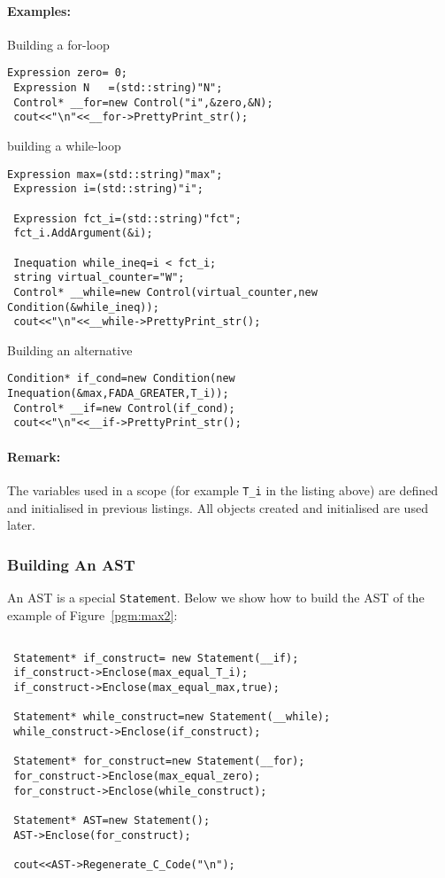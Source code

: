 \paragraph{Examples:}
Building a for-loop
\begin{lstlisting}[frame=single,framerule=0pt]
 Expression zero= 0;
 Expression N   =(std::string)"N";
 Control* __for=new Control("i",&zero,&N);
 cout<<"\n"<<__for->PrettyPrint_str();

\end{lstlisting}
building a while-loop
\begin{lstlisting}[frame=single,framerule=0pt]
 Expression max=(std::string)"max";
 Expression i=(std::string)"i";

 Expression fct_i=(std::string)"fct";
 fct_i.AddArgument(&i);

 Inequation while_ineq=i < fct_i;
 string virtual_counter="W";
 Control* __while=new Control(virtual_counter,new Condition(&while_ineq));
 cout<<"\n"<<__while->PrettyPrint_str();
\end{lstlisting}
Building an alternative
\begin{lstlisting}[frame=single,framerule=0pt]
 Condition* if_cond=new Condition(new Inequation(&max,FADA_GREATER,T_i));
 Control* __if=new Control(if_cond);
 cout<<"\n"<<__if->PrettyPrint_str();
\end{lstlisting}
\paragraph{Remark:} The variables used in a scope (for example \verb|T_i| in the listing above) are defined and initialised in previous listings. All objects created and initialised are used later.


\subsubsection{Building An AST}
An AST is a special \verb|Statement|. Below we show how to build the AST of the example of Figure~\ref{pgm:max2}:
\begin{lstlisting}[frame=single,framerule=0pt]

 Statement* if_construct= new Statement(__if);
 if_construct->Enclose(max_equal_T_i);
 if_construct->Enclose(max_equal_max,true);

 Statement* while_construct=new Statement(__while);
 while_construct->Enclose(if_construct);

 Statement* for_construct=new Statement(__for);
 for_construct->Enclose(max_equal_zero);
 for_construct->Enclose(while_construct);

 Statement* AST=new Statement();
 AST->Enclose(for_construct);

 cout<<AST->Regenerate_C_Code("\n");

\end{lstlisting}

